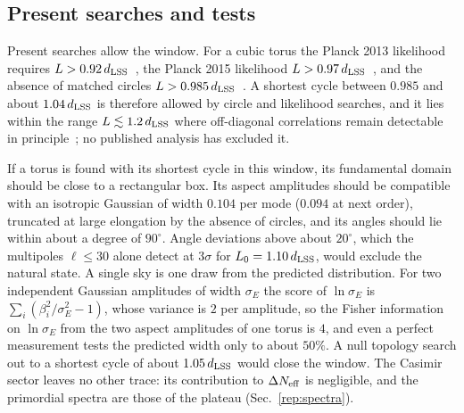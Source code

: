\subsection{Present searches and tests}
\label{rA:c-tests}

Present searches allow the window.
For a cubic torus the Planck 2013 likelihood requires $L>0.92\,d_{\mathrm{LSS}}$~\cite{Planck:2013okc}, the Planck 2015 likelihood $L>0.97\,d_{\mathrm{LSS}}$~\cite{Planck:2015gmu}, and the absence of matched circles $L>0.985\,d_{\mathrm{LSS}}$~\cite{COMPACT:2022nsu}. %
A shortest cycle between $0.985$ and about $1.04\,d_{\mathrm{LSS}}$ is therefore allowed by circle and likelihood searches, and it lies within the range $L\lesssim1.2\,d_{\mathrm{LSS}}$ where off-diagonal correlations remain detectable in principle~\cite{COMPACT:2023rkp}; no published analysis has excluded it. %

If a torus is found with its shortest cycle in this window, its fundamental domain should be close to a rectangular box.
Its aspect amplitudes should be compatible with an isotropic Gaussian of width $0.104$ per mode ($0.094$ at next order), truncated at large elongation by the absence of circles, and its angles should lie within about a degree of $90^\circ$. %
Angle deviations above about $20^\circ$, which the multipoles $\ell\leq30$ alone detect at $3\sigma$ for $L_0=1.10\,d_{\mathrm{LSS}}$, would exclude the natural state. %
A single sky is one draw from the predicted distribution.
For two independent Gaussian amplitudes of width $\sigma_E$ the score of $\ln\sigma_E$ is $\sum_i(\beta_i^2/\sigma_E^2-1)$, whose variance is $2$ per amplitude, so the Fisher information on $\ln\sigma_E$ from the two aspect amplitudes of one torus is $4$, and even a perfect measurement tests the predicted width only to about $50\%$. %
A null topology search out to a shortest cycle of about $1.05\,d_{\mathrm{LSS}}$ would close the window.
The Casimir sector leaves no other trace: its contribution to $\Delta N_{\rm eff}$ is negligible, and the primordial spectra are those of the plateau (Sec.~\ref{rep:spectra}).
